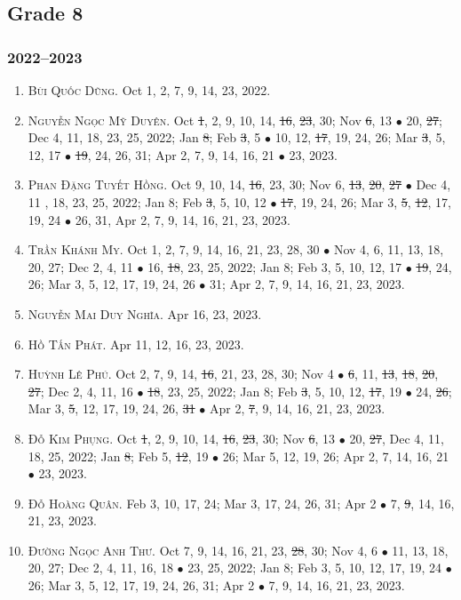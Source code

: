 \documentclass{article}
\begin{document}
\subsection{Grade 8}

\subsubsection{2022--2023}

\begin{enumerate}
	\item \textsc{Bùi Quốc Dũng.} {\sf[In]} Oct 1, 2, 7, 9, 14, 23, 2022. {\sf[Out]}
	\item \textsc{Nguyễn Ngọc Mỹ Duyên.} {\sf[In]} Oct \st{1}, 2, 9, 10, 14, \st{16}, \st{23}, 30; Nov \st{6}, 13 $\bullet$ 20, \st{27}; Dec 4, 11, 18, 23, 25, 2022; Jan \st{8}; Feb \st{3}, 5 $\bullet$ 10, 12, \st{17}, 19, 24, 26; Mar \st{3}, 5, 12, 17 $\bullet$ \st{19}, 24, 26, 31; Apr 2, 7, 9, 14, 16, 21 $\bullet$ 23, 2023.
	\item \textsc{Phan Đặng Tuyết Hồng.} {\sf[In]} Oct 9, 10, 14, \st{16}, 23, 30; Nov 6, \st{13}, \st{20}, \st{27} $\bullet$ Dec 4, 11 , 18, 23, 25, 2022; Jan 8; Feb \st{3}, 5, 10, 12 $\bullet$ \st{17}, 19, 24, 26; Mar 3, \st{5}, \st{12}, 17, 19, 24 $\bullet$ 26, 31, Apr 2, 7, 9, 14, 16, 21, 23, 2023.
	\item \textsc{Trần Khánh My.} {\sf[In]} Oct 1, 2, 7, 9, 14, 16, 21, 23, 28, 30 $\bullet$ Nov 4, 6, 11, 13, 18, 20, 27; Dec 2, 4, 11 $\bullet$ 16, \st{18}, 23, 25, 2022; Jan 8; Feb 3, 5, 10, 12, 17 $\bullet$ \st{19}, 24, 26; Mar 3, 5, 12, 17, 19, 24, 26 $\bullet$ 31; Apr 2, 7, 9, 14, 16, 21, 23, 2023.
	\item \textsc{Nguyễn Mai Duy Nghĩa.} {\sf[In]} Apr 16, 23, 2023.
	\item \textsc{Hồ Tấn Phát.} {\sf[In]} Apr 11, 12, 16, 23, 2023.
	\item \textsc{Huỳnh Lê Phú.} {\sf[In]} Oct 2, 7, 9, 14, \st{16}, 21, 23, 28, 30; Nov 4 $\bullet$ \st{6}, 11, \st{13}, \st{18}, \st{20}, \st{27}; Dec 2, 4, 11, 16 $\bullet$ \st{18}, 23, 25, 2022; Jan 8; Feb \st{3}, 5, 10, 12, \st{17}, 19 $\bullet$ 24, \st{26}; Mar 3, \st{5}, 12, 17, 19, 24, 26, \st{31} $\bullet$ Apr 2, \st{7}, 9, 14, 16, 21, 23, 2023.
	\item \textsc{Đỗ Kim Phụng.} {\sf[In]} Oct \st{1}, 2, 9, 10, 14, \st{16}, \st{23}, 30; Nov \st{6}, 13 $\bullet$ 20, \st{27}, Dec 4, 11, 18, 25, 2022; Jan \st{8}; Feb 5, \st{12}, 19 $\bullet$ 26; Mar 5, 12, 19, 26; Apr 2, 7, 14, 16, 21 $\bullet$ 23, 2023.
	\item \textsc{Đỗ Hoàng Quân.} {\sf[In]} Feb 3, 10, 17, 24; Mar 3, 17, 24, 26, 31; Apr 2 $\bullet$ 7, \st{9}, 14, 16, 21, 23, 2023.
	\item \textsc{Đường Ngọc Anh Thư.} {\sf[In]} Oct 7, 9, 14, 16, 21, 23, \st{28}, 30; Nov 4, 6 $\bullet$ 11, 13, 18, 20, 27; Dec 2, 4, 11, 16, 18 $\bullet$ 23, 25, 2022; Jan 8; Feb 3, 5, 10, 12, 17, 19, 24 $\bullet$ 26; Mar 3, 5, 12, 17, 19, 24, 26, 31; Apr 2 $\bullet$ 7, 9, 14, 16, 21, 23, 2023.
\end{enumerate}
\end{document}
